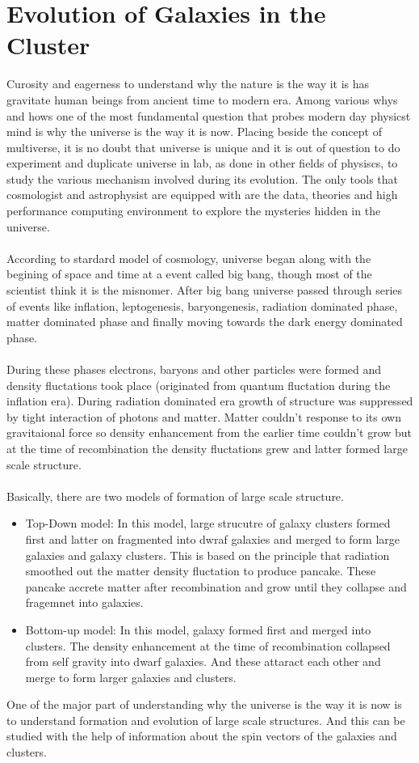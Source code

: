 \section{Evolution of Galaxies in the Cluster}
\noindent Curosity and eagerness to understand why the nature is the way it is has gravitate human beings from ancient time to modern era. Among various whys and hows one of the most fundamental question that probes modern day physicst mind is why the universe is the way it is now. Placing beside the concept of multiverse, it is no doubt that universe is unique and it is out of question to do experiment and duplicate universe in lab, as done in other fields of physiscs, to study the various mechanism involved during its evolution. The only tools that cosmologist and astrophysist are equipped with are the data, theories and high performance computing environment to explore the mysteries hidden in the universe.\\\\
According to stardard model of cosmology, universe began along with the begining of space and time at a event called big bang, though most of the scientist think it is the misnomer. After big bang universe passed through series of events like inflation, leptogenesis, baryongenesis, radiation dominated phase, matter dominated phase and finally moving towards the dark energy dominated phase.\\\\
During these phases electrons, baryons and other particles were formed and density fluctations took place (originated from quantum fluctation during the inflation era). During radiation dominated era growth of structure was suppressed by tight interaction of photons and matter. Matter couldn't response to its own gravitaional force so density enhancement from the earlier time couldn't grow but at the time of recombination the density fluctations grew and latter formed large scale structure.\\\\
Basically, there are two models of formation of large scale structure.
\begin{itemize}
\item Top-Down model: In this model, large strucutre of galaxy clusters formed first and latter on fragmented into dwraf galaxies and merged to form large galaxies and galaxy clusters. This is based on the principle that radiation smoothed out the matter density fluctation to produce pancake. These pancake accrete matter after recombination and grow until they collapse and fragemnet into galaxies.
\item Bottom-up model: In this model, galaxy formed first and merged into clusters. The density enhancement at the time of recombination collapsed from self gravity into dwarf galaxies. And these attaract each other and merge to form larger galaxies and clusters.
\end{itemize}
One of the major part of understanding why the universe is the way it is now is to understand formation and evolution of large scale structures. And this can be studied with the help of information about the spin vectors of the galaxies and clusters.\\\\
